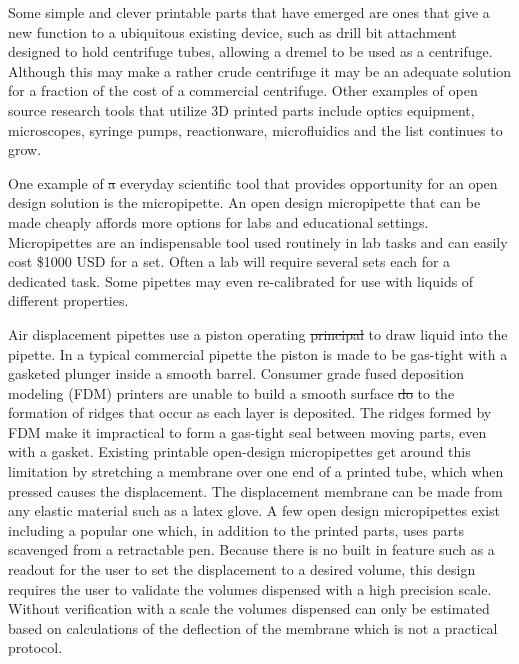 \documentclass[10pt,letterpaper]{article}
\providecommand{\DIFaddtex}[1]{{\protect\color{blue}\uwave{#1}}} %
\providecommand{\DIFdeltex}[1]{{\protect\color{red}\sout{#1}}}                      %
\providecommand{\DIFaddbegin}{} %
\providecommand{\DIFaddend}{} %
\providecommand{\DIFdelbegin}{} %
\providecommand{\DIFdelend}{} %
\providecommand{\DIFadd}[1]{\texorpdfstring{\DIFaddtex{#1}}{#1}} %
\providecommand{\DIFdel}[1]{\texorpdfstring{\DIFdeltex{#1}}{}} %
\begin{document}
Some simple and clever printable parts that have emerged are ones that give a new function to a ubiquitous existing device, such as drill bit attachment designed to hold centrifuge tubes, allowing a dremel to be used as a centrifuge\cite{Garvey2009}.
Although this may make a rather crude centrifuge it may be an adequate solution for a fraction of the cost of a commercial centrifuge.
Other examples of open source research tools that utilize 3D printed parts include optics equipment\cite{Zhang2013}, microscopes\cite{Baden2014a,Walus2014}, syringe pumps\cite{Wijnen2014,Patrick2015}, reactionware\cite{Symes2012,Kitson2012,Mathieson2013,Kitson2014}, microfluidics\cite{Brennan2015,Dragone2013} and the list continues to grow\cite{PlosCollections}.

One example of \DIFdelbegin \DIFdel{a }\DIFdelend \DIFaddbegin \DIFadd{an }\DIFaddend everyday scientific tool that provides opportunity for an open design solution is the micropipette.
An open design micropipette that can be made cheaply affords more options for labs and educational settings.
Micropipettes are an indispensable tool used routinely in lab tasks and can easily cost \$1000 USD for a set.
Often a lab will require several sets each for a dedicated task.
Some pipettes may even \DIFaddbegin \DIFadd{be }\DIFaddend re-calibrated for use with liquids of different properties.

Air displacement pipettes use a piston operating \DIFdelbegin \DIFdel{principal }\DIFdelend \DIFaddbegin \DIFadd{principle }\DIFaddend to draw liquid into the pipette\cite{ISO8655}.
In a typical commercial pipette the piston is made to be gas-tight with a gasketed plunger inside a smooth barrel.
Consumer grade fused deposition modeling (FDM) printers are unable to build a smooth surface \DIFdelbegin \DIFdel{do }\DIFdelend \DIFaddbegin \DIFadd{due }\DIFaddend to the formation of ridges that occur as each layer is deposited\cite{Takagishi2017}.
The ridges formed by FDM make it impractical to form a gas-tight seal between moving parts, even with a gasket.
Existing printable open-design micropipettes get around this limitation by stretching a membrane over one end of a printed tube, which when pressed causes the displacement.
The displacement membrane can be made from any elastic material such as a latex glove.
A few open design micropipettes exist including a popular one which, in addition to the printed parts, uses parts scavenged from a retractable pen\cite{Baden2014}.
Because there is no built in feature such as a readout for the user to set the displacement to a desired volume, this design requires the user to validate the volumes dispensed with a high precision scale.
Without verification with a scale the volumes dispensed can only be estimated based on calculations of the deflection of the membrane which is not a practical protocol.
\end{document}
